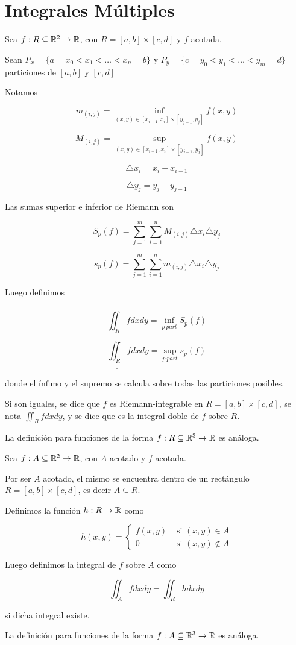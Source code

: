 \chapter{Integrales Múltiples}

\begin{definition}
Sea $f : R \subseteq \mathbb{R}^2 \to \mathbb{R} $, con $R = [a,b] \times [c,d]$ y $f$ acotada.

Sean $ P_x = \{ a = x_0 < x_1 < \ldots < x_n = b \}$ y $ P_y = \{ c = y_0 < y_1 < \ldots < y_m = d \}$ particiones de $[a,b]$ y $[c,d]$

Notamos

$$ m_{(i,j)} = \inf_{(x,y) \in [x_{i-1}, x_i] \times [y_{j-1}, y_j]} f(x,y) $$

$$ M_{(i,j)} = \sup_{(x,y) \in [x_{i-1}, x_i] \times [y_{j-1}, y_j]} f(x,y) $$

$$ \triangle x_i = x_i - x_{i-1}$$

$$ \triangle y_j = y_j - y_{j-1}$$

Las sumas superior e inferior de Riemann son

$$ S_p(f) = \sum_{j=1}^m \sum_{i=1}^n M_{(i,j)} \triangle x_i \triangle y_j$$

$$ s_p(f) = \sum_{j=1}^m \sum_{i=1}^n m_{(i,j)} \triangle x_i \triangle y_j$$

Luego definimos

$$ \overline{\iint_R} f dxdy = \inf_{p \ part} S_p(f)$$

$$ \underline{\iint_R} f dxdy = \sup_{p \ part} s_p(f)$$

donde el ínfimo y el supremo se calcula sobre todas las particiones posibles.

Si son iguales, se dice que $f$ es Riemann-integrable en $R = [a,b] \times [c,d]$, se nota $ \iint_R f dxdy$, y se dice que es la integral doble de $f$ sobre $R$.

La definición para funciones de la forma $f : R \subseteq \mathbb{R}^3 \to \mathbb{R} $ es análoga.
\end{definition}

\begin{definition}
Sea $f : A \subseteq \mathbb{R}^2 \to \mathbb{R} $, con $A$ acotado y $f$ acotada.

Por ser $A$ acotado, el mismo se encuentra dentro de un rectángulo $R = [a,b] \times [c,d]$, es decir $A \subseteq R$.  

Definimos la función $h : R \to \mathbb{R}$ como

$$ h(x,y) = \begin{cases} f(x,y) & \textrm{ si } (x,y) \in A \\ 0 & \textrm{ si } (x,y) \not\in A \end{cases} $$

Luego definimos la integral de $f$ sobre $A$ como

$$ \iint_A f dxdy = \iint_R h dxdy $$

si dicha integral existe.

La definición para funciones de la forma $f : A \subseteq \mathbb{R}^3 \to \mathbb{R} $ es análoga.
\end{definition}

